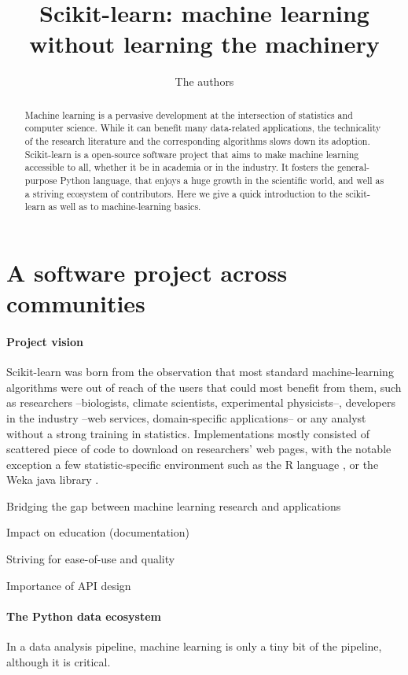 \documentclass[a4paper]{article}
\title{Scikit-learn: machine learning without learning the machinery}
\author{The authors}
\begin{document}
\maketitle

\begin{abstract}
Machine learning is a pervasive development at the intersection of
statistics and computer science. While it can benefit many
data-related applications, the technicality of the research literature
and the corresponding algorithms slows down its adoption. Scikit-learn is
a open-source software project that aims to make machine learning
accessible to all, whether it be in academia or in the industry. It
fosters the general-purpose Python language, that enjoys a huge growth in
the scientific world, and well as a striving ecosystem of contributors.
Here we give a quick introduction to the scikit-learn as well as to
machine-learning basics.
\end{abstract}

\section{A software project across communities}

\paragraph{Project vision}
%
Scikit-learn was born from the observation that most standard
machine-learning algorithms were out of reach of the users that could
most benefit from them, such as researchers --biologists, climate
scientists, experimental physicists--, developers in the industry --web
services, domain-specific applications-- or any analyst without a strong
training in statistics.
%
Implementations mostly consisted of scattered piece of code to download
on researchers' web pages, with the notable exception a few
statistic-specific environment such as the R language \cite{Rmanual}, or
the Weka java library \cite{hall2009weka}.

Bridging the gap between machine learning research and applications

\cite{pedregosa2011}

Impact on education (documentation)

Striving for ease-of-use and quality

Importance of API design \cite{buitinck2013ecml}

\paragraph{The Python data ecosystem}
%
In a data analysis pipeline, machine learning is only a tiny bit of the
pipeline, although it is critical.
\end{document}
